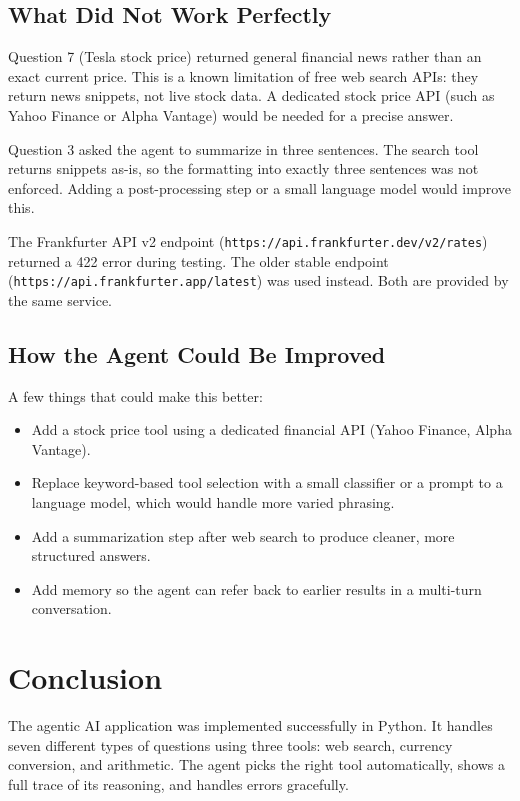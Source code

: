 \documentclass[11pt,a4paper]{article}
\begin{document}
\subsection{What Did Not Work Perfectly}

Question 7 (Tesla stock price) returned general financial news rather than an exact current price. This is a known limitation of free web search APIs: they return news snippets, not live stock data. A dedicated stock price API (such as Yahoo Finance or Alpha Vantage) would be needed for a precise answer.

Question 3 asked the agent to summarize in three sentences. The search tool returns snippets as-is, so the formatting into exactly three sentences was not enforced. Adding a post-processing step or a small language model would improve this.

The Frankfurter API v2 endpoint (\texttt{https://api.frankfurter.dev/v2/rates}) returned a 422 error during testing. The older stable endpoint (\texttt{https://api.frankfurter.app/latest}) was used instead. Both are provided by the same service.

\subsection{How the Agent Could Be Improved}

A few things that could make this better:

\begin{itemize}
    \item Add a stock price tool using a dedicated financial API (Yahoo Finance, Alpha Vantage).
    \item Replace keyword-based tool selection with a small classifier or a prompt to a language model, which would handle more varied phrasing.
    \item Add a summarization step after web search to produce cleaner, more structured answers.
    \item Add memory so the agent can refer back to earlier results in a multi-turn conversation.
\end{itemize}

\section{Conclusion}

The agentic AI application was implemented successfully in Python. It handles seven different types of questions using three tools: web search, currency conversion, and arithmetic. The agent picks the right tool automatically, shows a full trace of its reasoning, and handles errors gracefully.
\end{document}
